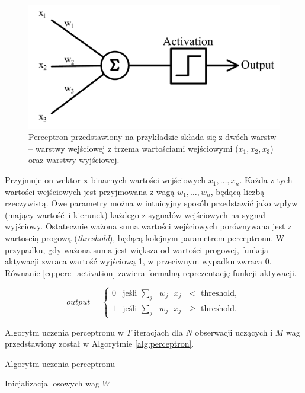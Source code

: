 \documentclass[12pt,a4paper,twoside]{article}
\begin{document}
\begin{figure}[h]
  \centering
\includegraphics[scale=0.6]{../obrazy/fig:perceptron.png}
\caption{Perceptron przedstawiony na przykładzie składa się z dwóch warstw – warstwy wejściowej z trzema wartościami wejściowymi (\(x_1, x_2, x_3 \)) oraz warstwy wyjściowej. \label{fig:perceptron}}
\end{figure}

Przyjmuje on wektor \(\mathbf{x}\) binarnych wartości wejściowych \(x_1, \ldots, x_n \). Każda z tych wartości wejściowych jest przyjmowana z wagą \(w_1, \ldots, w_n \), będącą liczbą rzeczywistą. Owe parametry można w intuicyjny sposób przedstawić jako wpływ (mający wartość i kierunek) każdego z sygnałów wejściowych na sygnał wyjściowy. Ostatecznie ważona suma wartości wejściowych porównywana jest z wartoscią progową (\textit{threshold}), będącą kolejnym parametrem perceptronu. W przypadku, gdy ważona suma jest większa od wartości progowej, funkcja aktywacji zwraca wartość wyjściową 1, w przeciwnym wypadku zwraca 0. Równanie \ref{eq:perc_activation} zawiera formalną reprezentację funkcji aktywacji.

\begin{equation} \label{eq:perc_activation}
  output=\begin{cases}
    0& \text{jeśli $\sum_j$ $w_j$ $x_j$ $<$ threshold},\\
    1& \text{jeśli $\sum_j$ $w_j$ $x_j$ $\geq$ threshold}.
  \end{cases}
\end{equation}

Algorytm uczenia perceptronu w $T$ iteracjach dla $N$ obserwacji uczących i $M$ wag przedstawiony został w Algorytmie \ref{alg:perceptron}.

\begin{algorithm}
\caption{Algorytm uczenia perceptronu}\label{alg:perceptron}
  \begin{algorithmic}[1]
    \State Inicjalizacja losowych wag $W$
        \EndFor
      \EndFor
    \EndFor
  \end{algorithmic}
\end{algorithm}
\end{document}
